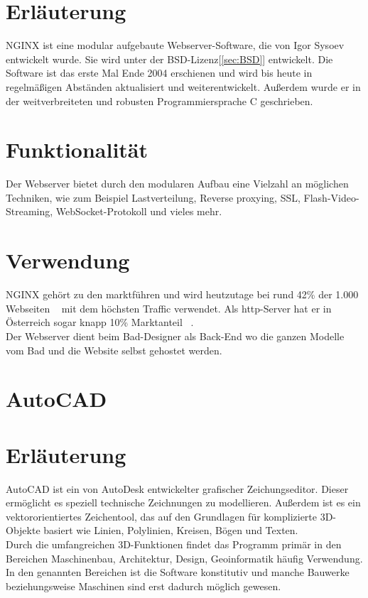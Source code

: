 \section*{Erläuterung} 
NGINX ist eine modular aufgebaute Webserver-Software, die von Igor Sysoev entwickelt wurde. Sie wird unter der BSD-Lizenz[\ref{sec:BSD}] entwickelt. Die Software ist das erste Mal Ende 2004 erschienen und wird bis heute in regelmäßigen Abständen aktualisiert und weiterentwickelt. Außerdem wurde er in der weitverbreiteten und robusten Programmiersprache C geschrieben.

\section*{Funktionalität}
Der Webserver bietet durch den modularen Aufbau eine Vielzahl an möglichen Techniken, wie zum Beispiel Lastverteilung, Reverse proxying, SSL, Flash-Video-Streaming, WebSocket-Protokoll und vieles mehr. 


\section*{Verwendung}
NGINX gehört zu den marktführen und wird heutzutage bei rund
 42\% der 1.000 Webseiten ~\cite{nginxWorldWide} mit dem höchsten Traffic verwendet. 
 Als http-Server hat er in Österreich sogar knapp 10\% Marktanteil ~\cite{nginxAT}. 
\\
Der Webserver dient beim Bad-Designer als Back-End wo die ganzen Modelle vom Bad und die Website selbst gehostet werden.




\clearpage
\newpage

\section{AutoCAD}

\section*{Erläuterung}
AutoCAD ist ein von AutoDesk entwickelter grafischer Zeichungseditor. Dieser ermöglicht es speziell technische Zeichnungen zu modellieren. Außerdem ist es ein vektororientiertes Zeichentool, das auf den Grundlagen für komplizierte 3D-Objekte basiert wie Linien, Polylinien, Kreisen, Bögen und Texten.
\\
Durch die umfangreichen 3D-Funktionen findet das Programm primär in den Bereichen Maschinenbau, Architektur, Design, Geoinformatik häufig Verwendung. In den genannten Bereichen ist die Software konstitutiv und manche Bauwerke beziehungsweise Maschinen sind erst dadurch möglich gewesen.

